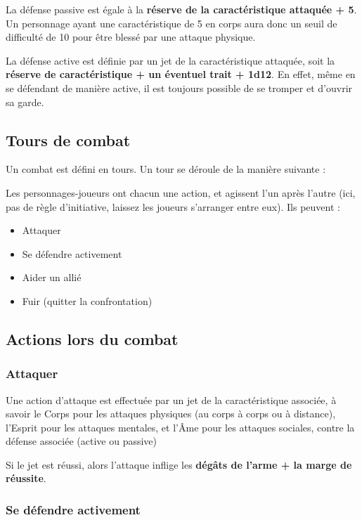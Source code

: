 La défense passive est égale à la \textbf{réserve de la caractéristique attaquée + 5}. Un personnage ayant une caractéristique de 5 en corps aura donc un seuil de difficulté de 10 pour être blessé par une attaque physique.

La défense active est définie par un jet de la caractéristique attaquée, soit la \textbf{réserve de caractéristique + un éventuel trait + 1d12}. En effet, même en se défendant de manière active, il est toujours possible de se tromper et d'ouvrir sa garde.

\subsection{Tours de combat}

Un combat est défini en tours. Un tour se déroule de la manière suivante :

Les personnages-joueurs ont chacun une action, et agissent l'un après l'autre (ici, pas de règle d'initiative, laissez les joueurs s'arranger entre eux). Ils peuvent :

\begin{itemize}
\item Attaquer
\item Se défendre activement
\item Aider un allié
\item Fuir (quitter la confrontation)
\end{itemize}

\subsection{Actions lors du combat}

\subsubsection*{Attaquer}

Une action d'attaque est effectuée par un jet de la caractéristique associée, à savoir le Corps pour les attaques physiques (au corps à corps ou à distance), l'Esprit pour les attaques mentales, et l'Âme pour les attaques sociales, contre la défense associée (active ou passive)

Si le jet est réussi, alors l'attaque inflige les \textbf{dégâts de l'arme + la marge de réussite}.

\subsubsection*{Se défendre activement}

